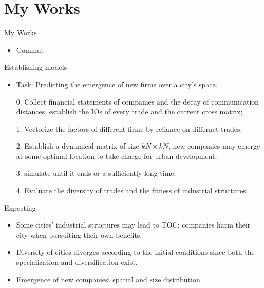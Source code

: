 \section{My Works}

\begin{frame}{My Works}
    \begin{itemize}
        \item Commut
    \end{itemize}
\end{frame}

\begin{frame}{Establishing models}
    \begin{itemize}
        \item Task: Predicting the emergence of new firms over a city's space.
        \item[0.] Collect financial statements of companies and the decay of communication distances, establish the IOs of every trade and the current cross matrix;
        \item[1.] Vectorize the factors of different firms by reliance on differnet trades;
        \item[2.] Establish a dynamical matrix of size $kN\times kN$, new companies may emerge at some optimal location to take charge for urban development;
        \item[3.] simulate until it ends or a sufficiently long time;
        \item[4.] Evaluate the diversity of trades and the fitness of industrial structures.
    \end{itemize}
\end{frame}

\begin{frame}{Expecting}
    \begin{itemize}
        \item Some cities' industrial structures may lead to TOC: companies harm their city when pursuiting their own benefits.
        \item Diversity of cities diverges according to the initial conditions since both the specialization and diversification exist.
        \item Emergence of new companies‘ spatial and size distribution.
    \end{itemize}
\end{frame}
